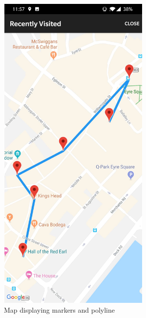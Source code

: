 \begin{figure}[ht!]
    \centering
 \includegraphics[width=75mm,height=162mm]{img/Markers_polyline.jpg}
\caption{Map displaying markers and polyline}
\label{fig:Map displaying markers and polyline}
\end{figure}

